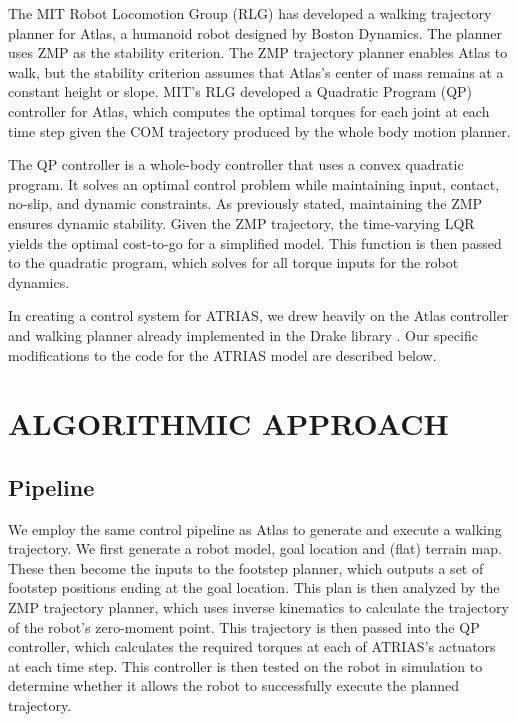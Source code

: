 \documentclass[letterpaper, 10 pt, conference]{ieeeconf}  %
\begin{document}
The MIT Robot Locomotion Group (RLG) has developed a walking trajectory planner for Atlas, a humanoid robot designed by Boston Dynamics. The planner uses ZMP as ​the stability criterion. The ZMP trajectory planner enables Atlas to walk, but the stability criterion assumes that Atlas's center of mass remains at a constant height or slope. \cite{dai14} MIT's RLG developed a Quadratic Program (QP) controller for Atlas, which computes the optimal torques for each joint at each time step given the COM trajectory produced by the whole body motion planner. \cite{kuindersma13}

The QP controller is a whole-body controller that uses a convex quadratic program. It solves an optimal control problem while maintaining input, contact, no-slip, and dynamic constraints. As previously stated, maintaining the ZMP ensures dynamic stability. Given the ZMP trajectory, the time-varying LQR yields the optimal cost-to-go for a simplified model. This function is then passed to the quadratic program, which solves for all torque inputs for the robot dynamics.

In creating a control system for ATRIAS, we drew heavily on the Atlas controller and walking planner already implemented in the Drake library \cite{c1}. Our specific modifications to the code for the ATRIAS model are described below.

\section{ALGORITHMIC APPROACH}

\subsection{Pipeline}

We employ the same control pipeline as Atlas to generate and execute a walking trajectory. We first generate a robot model, goal location and (flat) terrain map. These then become the inputs to the footstep planner, which outputs a set of footstep positions ending at the goal location. This plan is then analyzed by the ZMP trajectory planner, which uses inverse kinematics to calculate the trajectory of the robot’s zero-moment point. This trajectory is then passed into the QP controller, which calculates the required torques at each of ATRIAS's actuators at each time step. This controller is then tested on the robot in simulation to determine whether it allows the robot to successfully execute the planned trajectory. \cite{dai14}\cite{deits14}
\end{document}
